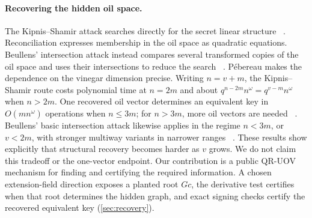 \documentclass[11pt,a4paper]{article}
\theoremstyle{definition}
\theoremstyle{remark}
\begin{document}
\paragraph{Recovering the hidden oil space.}
The Kipnis--Shamir attack searches directly for the secret linear structure
~\cite{KipnisShamir1998}.  Reconciliation expresses membership in the oil
space as quadratic equations.  Beullens' intersection attack instead compares
several transformed copies of the oil space and uses their intersections to
reduce the search
~\cite{DingEtAl2008,Beullens}.  P\'ebereau makes the dependence on the vinegar
dimension precise.  Writing $n=v+m$, the Kipnis--Shamir route costs polynomial
time at $n=2m$ and about $q^{n-2m}n^\omega=q^{v-m}n^\omega$ when $n>2m$.
One recovered oil vector determines an equivalent key in $O(mn^\omega)$
operations when $n\leq3m$; for $n>3m$, more oil vectors are needed
~\cite{Pebereau}.  Beullens' basic intersection attack likewise applies in the
regime $n<3m$, or $v<2m$, with stronger multiway variants in narrower ranges
~\cite{Beullens}.  These results show explicitly that structural recovery
becomes harder as $v$ grows.  We do not claim this tradeoff or the one-vector
endpoint.  Our contribution is a public QR-UOV mechanism for finding and
certifying the required information.  A chosen extension-field direction
exposes a planted root $Gc$, the derivative test certifies when that root
determines the hidden graph, and exact signing checks certify the recovered
equivalent key (\cref{sec:recovery}).
\end{document}
